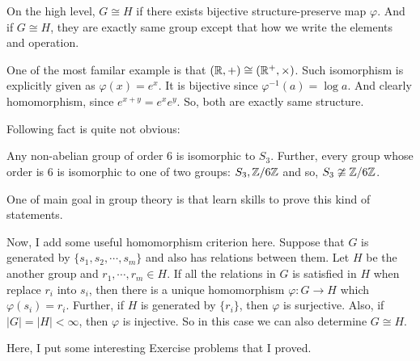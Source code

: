 \documentclass[12pt, a4paper, openany, twoside]{book}
\theoremstyle{definition}
\theoremstyle{remark}
\theoremstyle{plain}
\numberwithin{equation}{section}
\begin{document}
On the high level, $G \cong H$ if there exists bijective structure-preserve map $\varphi$. And if $G \cong H$, they are 
exactly same group except that how we write the elements and operation. 

One of the most familar example is that $({\mathbb {R}}, +) \cong ({\mathbb {R}}^+, \times)$. Such isomorphism is explicitly given as 
$\varphi(x) = e^x$. It is bijective since $\varphi^{-1}(a) = \log a$. And clearly homomorphism, since $e^{x+y} = e^x e^y$. 
So, both are exactly same structure. 

Following fact is quite not obvious: 

\begin{tcolorbox}[colback=yellow!10!white,colframe=red!75!black,title=First isomorphim classes]
    
Any non-abelian group of order 6 is isomorphic to $S_3$. Further, every group whose order is $6$ 
is isomorphic to one of two groups: $S_3, {\mathbb {Z}} / 6{\mathbb {Z}}$ and so, $S_3 \ncong {\mathbb {Z}} / 6{\mathbb {Z}}$. 

\end{tcolorbox}

One of main goal in group theory is that learn skills to prove this kind of statements. 

Now, I add some useful homomorphism criterion here. Suppose that $G$ is generated by 
\(\{s_1, s_2, \cdots, s_m\}\) and also has relations between them. Let $H$ be the another group and 
$r_1, \cdots, r_m \in H$. If all the relations in $G$ is satisfied in $H$ when replace $r_i$ into $s_i$, 
then there is a unique homomorphism $\varphi: G \rightarrow H$ which $\varphi(s_i) = r_i$. Further, if $H$ is 
generated by $\{r_i\}$, then $\varphi$ is surjective. Also, if $|G| = |H| < \infty$, then $\varphi$ is injective. So in this case 
we can also determine $G \cong H$. 

Here, I put some interesting Exercise problems that I proved. 
\end{document}
